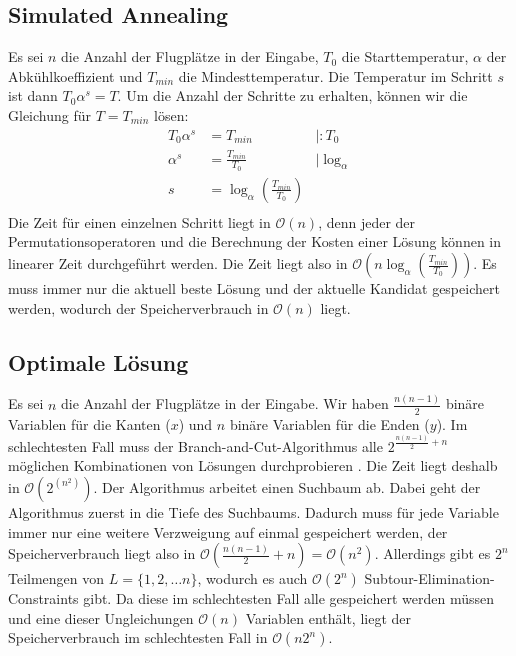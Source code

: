 \documentclass[a4paper,10pt,ngerman]{scrartcl}
\begin{document}
\subsection{Simulated Annealing}
Es sei $n$ die Anzahl der Flugplätze in der Eingabe, $T_0$ die Starttemperatur,
$\alpha$ der Abkühlkoeffizient und $T_{min}$ die Mindesttemperatur. Die
Temperatur im Schritt $s$ ist dann $T_0\alpha^s=T$. Um die Anzahl der Schritte
zu erhalten, können wir die Gleichung für $T=T_{min}$ lösen:
\begin{align*}
  T_0\alpha^s & = T_{min}                            & |:T_0          \\
  \alpha^s    & = \frac{T_{min}}{T_0}                & |\log_{\alpha} \\
  s           & = \log_{\alpha}(\frac{T_{min}}{T_0})                  \\
\end{align*}
Die Zeit für einen einzelnen Schritt liegt in $\mathcal{O}(n)$, denn jeder der Permutationsoperatoren
und die Berechnung der Kosten einer Lösung können in linearer Zeit durchgeführt werden. Die Zeit liegt also in
$\mathcal{O}(n\log_{\alpha}(\frac{T_{min}}{T_0}))$. Es muss immer nur die aktuell beste Lösung und der aktuelle Kandidat
gespeichert werden, wodurch der Speicherverbrauch in $\mathcal{O}(n)$ liegt.
\subsection{Optimale Lösung}
Es sei $n$ die Anzahl der Flugplätze in der Eingabe. Wir haben
$\frac{n(n-1)}{2}$ binäre Variablen für die Kanten ($x$) und $n$ binäre
Variablen für die Enden ($y$). Im schlechtesten Fall muss der
Branch-and-Cut-Algorithmus alle $2^{\frac{n(n-1)}{2}+n}$ möglichen
Kombinationen von Lösungen durchprobieren \cite[653]{korte_2018}. Die Zeit
liegt deshalb in $\mathcal{O}(2^(n^2))$. Der Algorithmus arbeitet einen
Suchbaum ab. Dabei geht der Algorithmus zuerst in die Tiefe des Suchbaums.
Dadurch muss für jede Variable immer nur eine weitere Verzweigung auf einmal
gespeichert werden, der Speicherverbrauch liegt also in
$\mathcal{O}(\frac{n(n-1)}{2}+n) = \mathcal{O}(n^2)$. Allerdings gibt es
$2^n$ Teilmengen von $L = \{1,2,\ldots n\}$, wodurch es auch $\mathcal{O}(2^n)$
Subtour-Elimination-Constraints gibt. Da diese im schlechtesten Fall alle
gespeichert werden müssen und eine dieser Ungleichungen $\mathcal{O}(n)$
Variablen enthält, liegt der Speicherverbrauch im schlechtesten Fall in $\mathcal{O}(n2^n)$.
\end{document}
